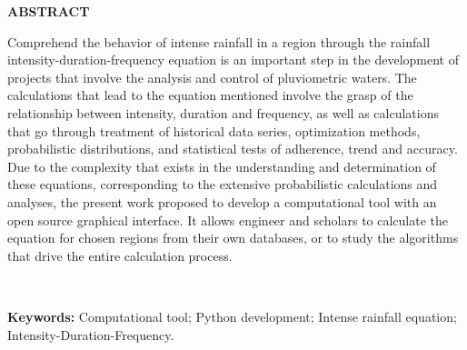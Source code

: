 \thispagestyle{empty}

\singlespacing
\begin{center}
	\textbf{ABSTRACT}
\end{center}

\noindent Comprehend the behavior of intense rainfall in a region through the rainfall intensity-duration-frequency equation is an important step in the development of projects that involve the analysis and control of pluviometric waters. The calculations that lead to the equation mentioned involve the grasp of the relationship between intensity, duration and frequency, as well as calculations that go through treatment of historical data series, optimization methods, probabilistic distributions, and statistical tests of adherence, trend and accuracy. Due to the complexity that exists in the understanding and determination of these equations, corresponding to the extensive probabilistic calculations and analyses, the present work proposed to develop a computational tool with an open source graphical interface. It allows engineer and scholars to calculate the equation for chosen regions from their own databases, or to study the algorithms that drive the entire calculation process.

\ \

\noindent \textbf{Keywords:} Computational tool; Python development; Intense rainfall equation; Intensity-Duration-Frequency.
\newpage